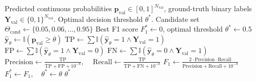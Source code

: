 \vspace{0.3cm}

\begin{algorithm}[H]
\caption{Validation-Calibrated Optimal Decision Threshold Search}
\label{alg:threshold_calibration}
\begin{algorithmic}[1]
\Require Predicted continuous probabilities $\mathbf{p}_{\text{val}} \in [0, 1]^{N_{\text{val}}}$, ground-truth binary labels $\mathbf{Y}_{\text{val}} \in \{0, 1\}^{N_{\text{val}}}$.
\Ensure Optimal decision threshold $\theta^*$.
\State Candidate set $\Theta_{\text{cand}} \leftarrow \{0.05, 0.06, \dots, 0.95\}$
\State Best F1 score $F_1^* \leftarrow 0$, optimal threshold $\theta^* \leftarrow 0.5$
    \State $\hat{\mathbf{y}}_\theta \leftarrow \mathbb{I}(\mathbf{p}_{\text{val}} \ge \theta)$
    \State $\text{TP} \leftarrow \sum \mathbb{I}( \hat{\mathbf{y}}_\theta = 1 \land \mathbf{Y}_{\text{val}} = 1 )$
    \State $\text{FP} \leftarrow \sum \mathbb{I}( \hat{\mathbf{y}}_\theta = 1 \land \mathbf{Y}_{\text{val}} = 0 )$
    \State $\text{FN} \leftarrow \sum \mathbb{I}( \hat{\mathbf{y}}_\theta = 0 \land \mathbf{Y}_{\text{val}} = 1 )$
    \State $\text{Precision} \leftarrow \frac{\text{TP}}{\text{TP} + \text{FP} + 10^{-8}}$, $\quad \text{Recall} \leftarrow \frac{\text{TP}}{\text{TP} + \text{FN} + 10^{-8}}$
    \State $F_1 \leftarrow \frac{2 \cdot \text{Precision} \cdot \text{Recall}}{\text{Precision} + \text{Recall} + 10^{-8}}$
        \State $F_1^* \leftarrow F_1, \quad \theta^* \leftarrow \theta$
    \EndIf
\EndFor
\State \Return $\theta^*$
\end{algorithmic}
\end{algorithm}


